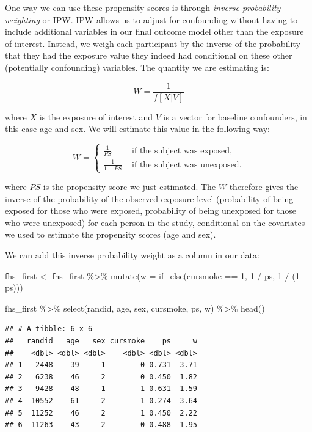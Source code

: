 \documentclass[
]{book}
\newenvironment{Shaded}{\begin{snugshade}}{\end{snugshade}}
\newcommand{\AttributeTok}[1]{\textcolor[rgb]{0.77,0.63,0.00}{#1}}
\newcommand{\DecValTok}[1]{\textcolor[rgb]{0.00,0.00,0.81}{#1}}
\newcommand{\FunctionTok}[1]{\textcolor[rgb]{0.00,0.00,0.00}{#1}}
\newcommand{\NormalTok}[1]{#1}
\newcommand{\OtherTok}[1]{\textcolor[rgb]{0.56,0.35,0.01}{#1}}
\newcommand{\SpecialCharTok}[1]{\textcolor[rgb]{0.00,0.00,0.00}{#1}}
\begin{document}
One way we can use these propensity scores is through \emph{inverse probability weighting} or IPW. IPW allows us to adjust for confounding without having to include additional variables in our final outcome model other than the exposure of interest. Instead, we weigh each participant by the inverse of the probability that they had the exposure value they indeed had conditional on these other (potentially confounding) variables. The quantity we are estimating is:

\[
W=\frac{1}{f[X|V]}
\]

where \(X\) is the exposure of interest and \(V\) is a vector for baseline confounders, in this case age and sex. We will estimate this value in the following way:

\[
W = \begin{cases}
\frac{1}{PS} &\mbox{ if the subject was exposed},\\
\frac{1}{1-PS} &\mbox{ if the subject was unexposed.}
\end{cases}
\]

where \(PS\) is the propensity score we just estimated. The \(W\) therefore gives the inverse of the probability of the observed exposure level (probability of being exposed for those who were exposed, probability of being unexposed for those who were unexposed) for each person in the study, conditional on the covariates we used to estimate the propensity scores (age and sex).

We can add this inverse probability weight as a column in our data:

\begin{Shaded}
\begin{Highlighting}[]
\NormalTok{fhs\_first }\OtherTok{\textless{}{-}}\NormalTok{ fhs\_first }\SpecialCharTok{\%\textgreater{}\%} 
  \FunctionTok{mutate}\NormalTok{(}\AttributeTok{w =} \FunctionTok{if\_else}\NormalTok{(cursmoke }\SpecialCharTok{==} \DecValTok{1}\NormalTok{, }\DecValTok{1} \SpecialCharTok{/}\NormalTok{ ps, }\DecValTok{1} \SpecialCharTok{/}\NormalTok{ (}\DecValTok{1} \SpecialCharTok{{-}}\NormalTok{ ps)))}

\NormalTok{fhs\_first }\SpecialCharTok{\%\textgreater{}\%} 
  \FunctionTok{select}\NormalTok{(randid, age, sex, cursmoke, ps, w) }\SpecialCharTok{\%\textgreater{}\%} 
  \FunctionTok{head}\NormalTok{()}
\end{Highlighting}
\end{Shaded}

\begin{verbatim}
## # A tibble: 6 x 6
##   randid   age   sex cursmoke    ps     w
##    <dbl> <dbl> <dbl>    <dbl> <dbl> <dbl>
## 1   2448    39     1        0 0.731  3.71
## 2   6238    46     2        0 0.450  1.82
## 3   9428    48     1        1 0.631  1.59
## 4  10552    61     2        1 0.274  3.64
## 5  11252    46     2        1 0.450  2.22
## 6  11263    43     2        0 0.488  1.95
\end{verbatim}
\end{document}
